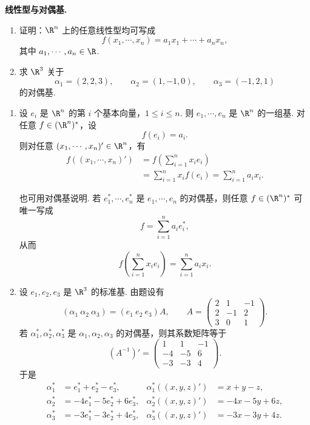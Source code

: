 \begin{problem}
	\textbf{线性型与对偶基.}
	\begin{enumerate}
		\item 证明：$\R^n$ 上的任意线性型均可写成
		\[
		f(x_1,\cdots,x_n)=a_1x_1+\cdots+a_nx_n,
		\]
		其中 $a_1,\cdots,a_n\in\R$.
		\item 求 $\R^3$ 关于
		\[
		\alpha_1=(2,2,3),
		\qquad
		\alpha_2=(1,-1,0),
		\qquad
		\alpha_3=(-1,2,1)
		\]
		的对偶基.
	\end{enumerate}
\end{problem}

\begin{solution}
	\begin{enumerate}
		\item 设 $e_i$ 是 $\R^n$ 的第 $i$ 个基本向量，$1\le i\le n$. 则 $e_1,\cdots,e_n$ 是 $\R^n$ 的一组基. 对任意 $f\in(\R^n)^*$，设
		\[
		f(e_i)=a_i.
		\]
		则对任意 $(x_1,\cdots,x_n)'\in\R^n$，有
		\[
		\begin{aligned}
			f((x_1,\cdots,x_n)')
			&=f\left(\sum_{i=1}^n x_ie_i\right) \\
			&=\sum_{i=1}^n x_if(e_i)
			=\sum_{i=1}^n a_ix_i.
		\end{aligned}
		\]
		
		也可用对偶基说明. 若 $e_1^*,\cdots,e_n^*$ 是 $e_1,\cdots,e_n$ 的对偶基，则任意 $f\in(\R^n)^*$ 可唯一写成
		\[
		f=\sum_{i=1}^n a_ie_i^*,
		\]
		从而
		\[
		f\left(\sum_{i=1}^n x_ie_i\right)=\sum_{i=1}^n a_ix_i.
		\]
		
		\item 设 $e_1,e_2,e_3$ 是 $\R^3$ 的标准基. 由题设有
		\[
		(\alpha_1\ \alpha_2\ \alpha_3)=(e_1\ e_2\ e_3)A,
		\qquad
		A=\begin{pmatrix}
			2&1&-1\\
			2&-1&2\\
			3&0&1
		\end{pmatrix}.
		\]
		若 $\alpha_1^*,\alpha_2^*,\alpha_3^*$ 是 $\alpha_1,\alpha_2,\alpha_3$ 的对偶基，则其系数矩阵等于
		\[
		(A^{-1})'
		=\begin{pmatrix}
			1&1&-1\\
			-4&-5&6\\
			-3&-3&4
		\end{pmatrix}.
		\]
		于是
		\[
		\begin{aligned}
			\alpha_1^*&=e_1^*+e_2^*-e_3^*,
			&\alpha_1^*((x,y,z)')&=x+y-z,\\
			\alpha_2^*&=-4e_1^*-5e_2^*+6e_3^*,
			&\alpha_2^*((x,y,z)')&=-4x-5y+6z,\\
			\alpha_3^*&=-3e_1^*-3e_2^*+4e_3^*,
			&\alpha_3^*((x,y,z)')&=-3x-3y+4z.
		\end{aligned}
		\]
	\end{enumerate}
\end{solution}

